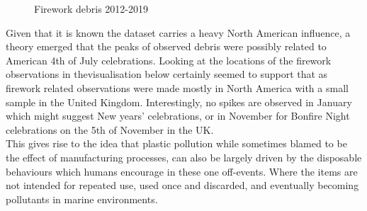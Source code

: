 \documentclass[10pt]{article}\usepackage[]{graphicx}\usepackage[]{color}
\newenvironment{knitrout}{}{} %
\begin{document}
\begin{figure}[H]
\begin{center}
\begin{knitrout}
\end{knitrout}
\caption {Firework debris 2012-2019}
\label{figA1}
\end {center}
\end {figure}

Given that it is known the dataset carries a heavy North American influence, a theory emerged that the peaks of observed debris were possibly related to American 4th of July celebrations. Looking at the locations of the firework observations in thevisualisation below certainly seemed to support that as firework related observations were made mostly in North America with a small sample in the United Kingdom. Interestingly, no spikes are observed in January which might suggest New years' celebrations, or in November for Bonfire Night celebrations on the 5th of November in the UK.\\

This gives rise to the idea that plastic pollution while sometimes blamed to be the effect of manufacturing processes, can also be largely driven by the disposable behaviours which humans encourage in these one off-events. Where the items are not intended for repeated use, used once and discarded, and eventually becoming pollutants in marine environments.
\end{document}
